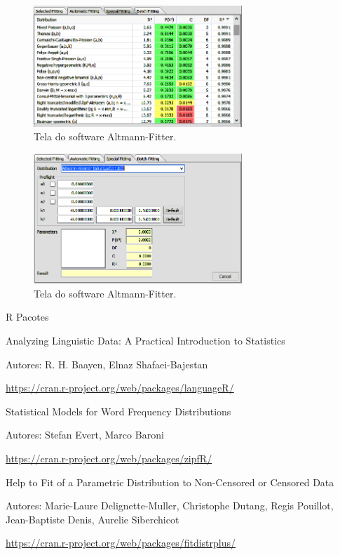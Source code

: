 \documentclass[
  ignorenonframetext,
  aspectratio=169]{beamer}
\providecommand{\tightlist}{%
  \setlength{\itemsep}{0pt}\setlength{\parskip}{0pt}}
\begin{document}
\begin{frame}
\begin{figure}
\centering
\includegraphics[width=0.7\textwidth,height=\textheight]{altmannfitter2.png}
\caption{Tela do software Altmann-Fitter.}
\end{figure}
\end{frame}

\begin{frame}
\begin{figure}
\centering
\includegraphics[width=0.7\textwidth,height=\textheight]{altmannfitter3.png}
\caption{Tela do software Altmann-Fitter.}
\end{figure}
\end{frame}

\begin{frame}{R}
\protect\hypertarget{r}{}
Pacotes

\begin{description}
\tightlist
\item[languageR]
Analyzing Linguistic Data: A Practical Introduction to Statistics

Autores: R. H. Baayen, Elnaz Shafaei-Bajestan

\url{https://cran.r-project.org/web/packages/languageR/}
\item[zipfR]
Statistical Models for Word Frequency Distributions

Autores: Stefan Evert, Marco Baroni

\url{https://cran.r-project.org/web/packages/zipfR/}
\item[fitdistrplus]
Help to Fit of a Parametric Distribution to Non-Censored or Censored
Data

Autores: Marie-Laure Delignette-Muller, Christophe Dutang, Regis
Pouillot, Jean-Baptiste Denis, Aurelie Siberchicot

\url{https://cran.r-project.org/web/packages/fitdistrplus/}
\end{description}
\end{frame}
\end{document}
